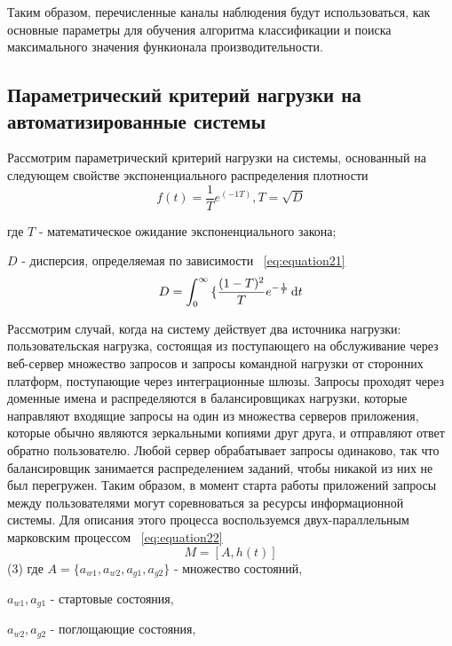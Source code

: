 Таким образом, перечисленные каналы наблюдения будут использоваться, как основные параметры для обучения алгоритма классификации и поиска максимального значения функионала производительности.


\subsection{Параметрический критерий нагрузки на автоматизированные системы}\label{sec:ch2/sec2/sub2}
Рассмотрим параметрический критерий нагрузки на системы, основанный на следующем свойстве экспоненциального распределения плотности 
\begin{equation}
    \label{eq:equation20}
    f(t) = \frac{1}{T}e^{(-1T)}, T = \sqrt{D}  
\end{equation}

где $T$ - математическое ожидание экспоненциального закона;

$D$ - дисперсия, определяемая по зависимости ~\cref{eq:equation21}
\begin{equation}
    \label{eq:equation21}
    D = \int_0^{\infty} \mathrm \{\frac{(1-T)^2}{T}e^{-\frac{1}{T}}\,\mathrm{d}t    
\end{equation}

Рассмотрим случай, когда на систему действует два источника нагрузки: пользовательская нагрузка, состоящая из поступающего на обслуживание через веб-сервер множество запросов и запросы командной нагрузки от сторонних платформ, поступающие через интеграционные шлюзы. Запросы проходят через доменные имена и распределяются в балансировщиках нагрузки, которые направляют входящие запросы на один из множества серверов приложения, которые обычно являются зеркальными копиями друг друга, и отправляют ответ обратно пользователю. Любой сервер обрабатывает запросы одинаково, так что балансировщик занимается распределением заданий, чтобы никакой из них не был перегружен.
Таким образом, в момент старта работы приложений запросы между пользователями могут соревноваться за ресурсы информационной системы. Для описания этого процесса воспользуемся двух-параллельным марковским процессом ~\cref{eq:equation22}
\begin{equation}
    \label{eq:equation22}
    M = [A, h(t)]  
\end{equation}
                       (3)
где $ A = \{a_{w1},a_{w2}, a_{g1},a_{g2} \}$ - множество состояний, 

$a_{w1}, a_{g1}$ - стартовые состояния, 

$a_{w2}, a_{g2}$ - поглощающие состояния, 

